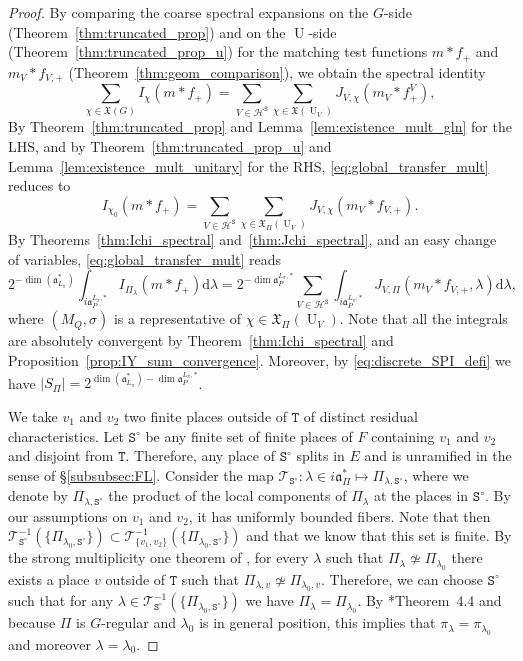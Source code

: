 \documentclass[letterpaper,11pt]{amsart}
\newcommand{\fa}{\mathfrak{a}}
\newcommand{\fX}{\mathfrak{X}}
\newcommand{\cH}{\mathcal{H}}
\newcommand{\cT}{\mathcal{T}}
\newcommand{\rd}{\mathrm{d}}
\newcommand{\tS}{\mathtt{S}}
\newcommand{\tT}{\mathtt{T}}
\newcommand{\<}{\negthickspace}
\DeclareMathOperator{\U}{U}
\theoremstyle{definition}
\theoremstyle{plain}
\theoremstyle{remark}
\numberwithin{equation}{section}
\begin{document}
\begin{proof}
By comparing the coarse spectral expansions on the $G$-side (Theorem~\ref{thm:truncated_prop}) and on the $\U$-side (Theorem~\ref{thm:truncated_prop_u}) for the matching test functions $m*f_+$ and $m_V*f_{V,+}$ (Theorem~\ref{thm:geom_comparison}), we obtain the
spectral identity
\begin{equation}
\label{eq:global_transfer_mult}
    \sum_{\chi \in \fX(G)} I_{\chi}(m*f_+)=\sum_{V \in \cH^\tS} \sum_{\chi \in \fX(\U_V)} J_{V,\chi}(m_V*f_+^V),
\end{equation}
By Theorem~\ref{thm:truncated_prop} and Lemma~\ref{lem:existence_mult_gln}
for the LHS, and by Theorem~\ref{thm:truncated_prop_u} and
Lemma~\ref{lem:existence_mult_unitary} for the RHS,
\eqref{eq:global_transfer_mult} reduces to
\begin{equation*}
    I_{\chi_0}(m*f_+)=\sum_{V \in \cH^\tS}  \sum_{\chi \in \fX_\Pi(\U_V)} J_{V,\chi}(m_V*f_{V,+}).
\end{equation*}
By Theorems~\ref{thm:Ichi_spectral} and~\ref{thm:Jchi_spectral}, and an easy
change of variables, \eqref{eq:global_transfer_mult} reads
\begin{equation}
    2^{-\dim(\fa^*_{L_\pi})} \int_{i \fa_{P}^{L_\pi, *}} I_{\Pi_\lambda}(m*f_+) \rd\lambda=2^{-\dim \fa_{P}^{L_\pi,*}}
 \sum_{V \in \cH^\tS} \int_{i \fa_{P}^{L_\pi, *}} J_{V,\Pi}( m_V*f_{V,+},\lambda) \rd\lambda, \label{eq:global_integral}
\end{equation}
where $(M_Q,\sigma)$ is a representative of $\chi \in \fX_\Pi(\U_V)$. Note that all the integrals are absolutely convergent by Theorem~\ref{thm:Ichi_spectral} and Proposition~\ref{prop:IY_sum_convergence}. Moreover, by \eqref{eq:discrete_SPI_defi} we have $|S_\Pi|=2^{\dim(\fa^*_{L_\pi})-\dim \fa_{P}^{L_\pi,*}}$. 

We take $v_1$ and $v_2$ two finite places outside of $\tT$ of distinct residual characteristics. Let $\tS^\circ$ be any finite set of finite places of $F$ containing $v_1$ and $v_2$ and disjoint from $\tT$. Therefore, any place of $\tS^\circ$ splits in $E$ and is unramified in the sense of \S\ref{subsubsec:FL}. Consider the map $\cT_{\tS^\circ}: \lambda \in i \fa_{\Pi}^* \mapsto \Pi_{\lambda,\tS^\circ}$, where we denote by $\Pi_{\lambda,\tS^\circ}$ the product of the local components of $\Pi_\lambda$ at the places in $\tS^\circ$. By our assumptions on $v_1$ and $v_2$, it has uniformly bounded fibers. Note that then $\cT_{\tS^{\circ}}^{-1}(\{\Pi_{\lambda_0,\tS^\circ}\}) \subset \cT_{\{v_1,v_2\}}^{-1}(\{\Pi_{\lambda_0,\tS^\circ}\})$ and that we know that this set is finite. By the strong multiplicity one theorem of \cite{Ram}, for every $\lambda$ such that $\Pi_\lambda \not\simeq \Pi_{\lambda_0}$ there exists a place $v$ outside of $\tT$ such that $\Pi_{\lambda,v} \not\simeq \Pi_{\lambda_0,v}$. Therefore, we can choose $\tS^\circ$ such that for any $\lambda \in \cT_{\tS^\circ}^{-1}(\{\Pi_{\lambda_0,\tS^\circ}\})$ we have $\Pi_\lambda=\Pi_{\lambda_0}$. By \cite{JS}*{Theorem~4.4} and because $\Pi$ is $G$-regular and $\lambda_0$ is in general position, this implies that $\pi_\lambda=\pi_{\lambda_0}$ and moreover $\lambda=\lambda_0$.


\end{proof}
\end{document}
